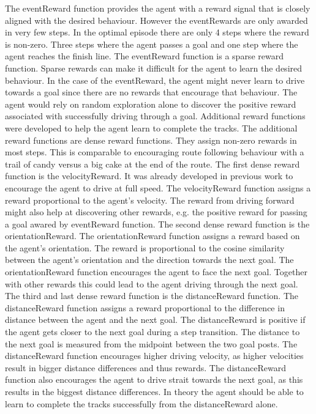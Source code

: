 The eventReward function provides the agent with a reward signal that is closely aligned with the desired behaviour. However the eventRewards are only awarded in very few steps. In the optimal episode there are only 4 steps where the reward is non-zero. Three steps where the agent passes a goal and one step where the agent reaches the finish line. The eventReward function is a sparse reward function. Sparse rewards can make it difficult for the agent to learn the desired behaviour. In the case of the eventReward, the agent might never learn to drive towards a goal since there are no rewards that encourage that behaviour. The agent would rely on random exploration alone to discover the positive reward associated with successfully driving through a goal.
Additional reward functions were developed to help the agent learn to complete the tracks. The additional reward functions are dense reward functions. They assign non-zero rewards in most steps. This is comparable to encouraging route following behaviour with a trail of candy versus a big cake at the end of the route. 
The first dense reward function is the velocityReward. It was already developed in previous work \autocite{maximilian} to encourage the agent to drive at full speed. The velocityReward function assigns a reward proportional to the agent's velocity. The reward from driving forward might also help at discovering other rewards, e.g. the positive reward for passing a goal awared by eventReward function. 
The second dense reward function is the orientationReward. The orientationReward function assigns a reward based on the agent's orientation. The reward is proportional to the cosine similarity between the agent's orientation and the direction towards the next goal. The orientationReward function encourages the agent to face the next goal. Together with other rewards this could lead to the agent driving through the next goal.
The third and last dense reward function is the distanceReward function. The distanceReward function assigns a reward proportional to the difference in distance between the agent and the next goal. The distanceReward is positive if the agent gets closer to the next goal during a step transition. The distance to the next goal is measured from the midpoint between the two goal posts. The distanceReward function encourages higher driving velocity, as higher velocities result in bigger distance differences and thus rewards. The distanceReward function also encourages the agent to drive strait towards the next goal, as this results in the biggest distance differences. In theory the agent should be able to learn to complete the tracks successfully from the distanceReward alone.

